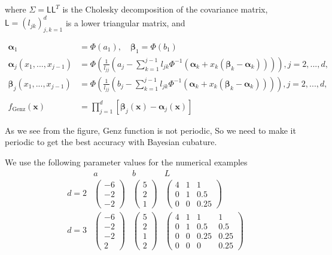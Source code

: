 \documentclass[twocolumn]{svjour3}          %
\newcommand{\bm}[1]{\boldsymbol{#1}}
\newcommand{\mSigma}{\Sigma}
\newcommand{\valpha}{{\bm{\alpha}}}
\newcommand{\vbeta}{{\bm{\beta}}}
\newcommand{\vx}{\bm{x}}
\newcommand{\mL}{\mathsf{L}}
\begin{document}
\begin{enumerate}
where $\mSigma= \mL \mL^T$ is the Cholesky decomposition of the covariance matrix, $\mL = (l_{jk})_{j,k=1}^d$ is a lower triangular matrix, and

\begin{align*}
\valpha_1 &= \Phi(a_1), \quad \vbeta_1 = \Phi(b_1)
\\
\valpha_j(x_1,...,x_{j-1}) &= \Phi
\left(
\frac{1}{l_{jj}} 
\left(
a_j - \sum_{k=1}^{j-1} l_{jk} \Phi^{-1}(\valpha_k + x_k(\vbeta_k-\valpha_k))
\right)
\right), j=2,...,d,
\\
\vbeta_j(x_1,...,x_{j-1}) &= \Phi
\left(
\frac{1}{l_{jj}} 
\left(
b_j - \sum_{k=1}^{j-1} l_{jk} \Phi^{-1}(\valpha_k + x_k(\vbeta_k-\valpha_k))
\right)
\right), j=2,...,d,
\\
\\
f_{\text{Genz}}(\vx) &= \prod_{j=1}^d [\vbeta_j(\vx) - \valpha_j(\vx)]
\end{align*}

As we see from the figure, Genz function is not periodic, So we need to make it periodic to get the best accuracy with Bayesian cubature.


We use the following parameter values for the numerical examples
\begin{equation*}
\begin{array}{c|ccc}
 & a  & b & L  \\
\hline
d=2 
 & 
\begin{pmatrix}
-6 \\ -2 \\ -2
\end{pmatrix}
 & 
\begin{pmatrix}
5 \\ 2 \\ 1
\end{pmatrix} 
 & 
\begin{pmatrix}
4 & 1 & 1 \\ 0 & 1 & 0.5 \\ 0 & 0 & 0.25
\end{pmatrix} 
\\
d=3
 & 
\begin{pmatrix}
-6 \\ -2 \\ -2 \\ 2
\end{pmatrix}
 & 
\begin{pmatrix}
5 \\ 2 \\ 1 \\2
\end{pmatrix} 
 & 
\begin{pmatrix}
4 & 1 & 1 & 1\\ 0 & 1 & 0.5 & 0.5 \\ 0 & 0 & 0.25 & 0.25 \\ 0 & 0 & 0 & 0.25
\end{pmatrix} 
\end{array}
\end{equation*}


\end{enumerate}
\end{document}
